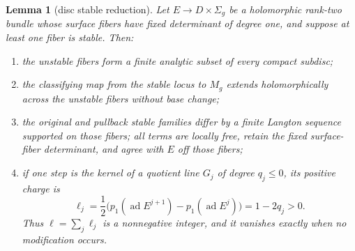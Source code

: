 \documentclass[11pt]{amsart}
\newtheorem{lemma}[theorem]{Lemma}
\theoremstyle{definition}
\theoremstyle{remark}
\theoremstyle{plain}
\newcommand{\ad}{\operatorname{ad}}
\begin{document}
\begin{lemma}[disc stable reduction]\label{lem:disc-reduction}
Let $E\to D\times\Sigma_g$ be a holomorphic rank-two bundle whose surface
fibers have fixed determinant of degree one, and suppose at least one fiber
is stable.
Then:
\begin{enumerate}
\item the unstable fibers form a finite analytic subset of every compact
subdisc;
\item the classifying map from the stable locus to $M_g$ extends
holomorphically across the unstable fibers without base change;
\item the original and pullback stable families differ by a finite Langton
sequence supported on those fibers; all terms are locally free, retain the
fixed surface-fiber determinant, and agree with $E$ off those fibers;
\item if one step is the kernel of a quotient line $G_j$ of degree
$q_j\leq0$, its positive charge is
\[
 \ell_j=\frac12\bigl(p_1(\ad E^{j+1})-p_1(\ad E^j)\bigr)
       =1-2q_j>0.
\]
Thus $\ell=\sum_j\ell_j$ is a nonnegative integer, and it vanishes exactly
when no modification occurs.
\end{enumerate}
\end{lemma}
\end{document}
